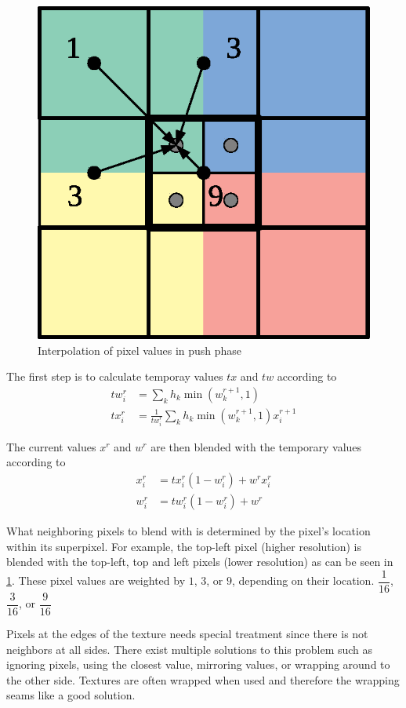 \begin{figure}[h]
    \centering
    \includegraphics[width=.5\textwidth]{figures/push_filter_color.eps}
    \caption{Interpolation of pixel values in push phase}
    \label{fig:push_filter}
\end{figure}

The first step is to calculate temporay values $tx$ and $tw$ according to
\begin{align}
  tw^{r}_i &= \sum_k {h_k \min(w^{r+1}_k,1)} \label{eq:push_tw}\\
  tx^{r}_i &= \frac{1}{tw^{r}_i} \sum_k {h_k \min(w^{r+1}_k,1) x^{r+1}_i} \label{eq:push_tx}
\end{align}

The current values $x^r$ and $w^r$ are then blended with the temporary values according to
\begin{align}
  x^r_i &= tx^r_i (1 - w^r_i) + w^r x^r_i \label{eq:push_x}\\
  w^r_i &= tw^r_i (1 - w^r_i) + w^r \label{eq:push_w}
\end{align}

 What neighboring pixels to blend with is determined by the pixel's location within its superpixel. For example, the top-left pixel (higher resolution) is blended with the top-left, top and left pixels (lower resolution) as can be seen in \cref{fig:push_filter}. These pixel values are weighted by $1$, $3$, or $9$,  depending on their location. $\dfrac{1}{16}$, $\dfrac{3}{16}$, or $\dfrac{9}{16}$

 Pixels at the edges of the texture needs special treatment since there is not neighbors at all sides. There exist multiple solutions to this problem such as ignoring pixels, using the closest value, mirroring values, or wrapping around to the other side. Textures are often wrapped when used and therefore the wrapping seams like a good solution.
 
